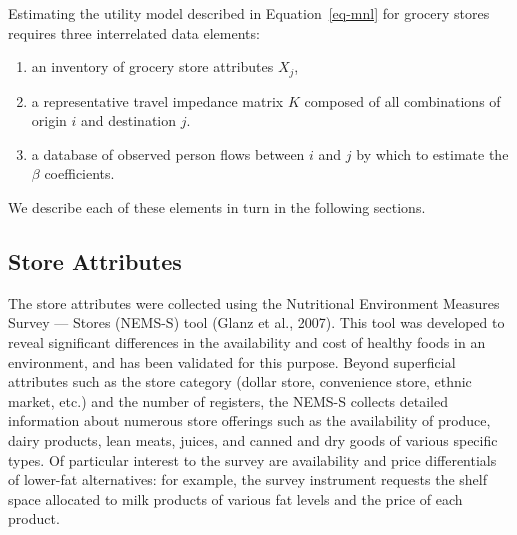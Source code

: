 \documentclass[
  letterpaper,
  DIV=11,
  numbers=noendperiod]{scrreport}
\providecommand{\tightlist}{%
  \setlength{\itemsep}{0pt}\setlength{\parskip}{0pt}}\usepackage{longtable,booktabs,array}
\begin{document}
Estimating the utility model described in Equation~\ref{eq-mnl} for
grocery stores requires three interrelated data elements:

\begin{enumerate}
\def\labelenumi{\arabic{enumi}.}
\tightlist
\item
  an inventory of grocery store attributes \(X_j\),
\item
  a representative travel impedance matrix \(K\) composed of all
  combinations of origin \(i\) and destination \(j\).
\item
  a database of observed person flows between \(i\) and \(j\) by which
  to estimate the \(\beta\) coefficients.
\end{enumerate}

We describe each of these elements in turn in the following sections.

\hypertarget{store-attributes}{%
\subsection{Store Attributes}\label{store-attributes}}

The store attributes were collected using the Nutritional Environment
Measures Survey --- Stores (NEMS-S) tool (Glanz et al., 2007). This tool
was developed to reveal significant differences in the availability and
cost of healthy foods in an environment, and has been validated for this
purpose. Beyond superficial attributes such as the store category
(dollar store, convenience store, ethnic market, etc.) and the number of
registers, the NEMS-S collects detailed information about numerous store
offerings such as the availability of produce, dairy products, lean
meats, juices, and canned and dry goods of various specific types. Of
particular interest to the survey are availability and price
differentials of lower-fat alternatives: for example, the survey
instrument requests the shelf space allocated to milk products of
various fat levels and the price of each product.
\end{document}
